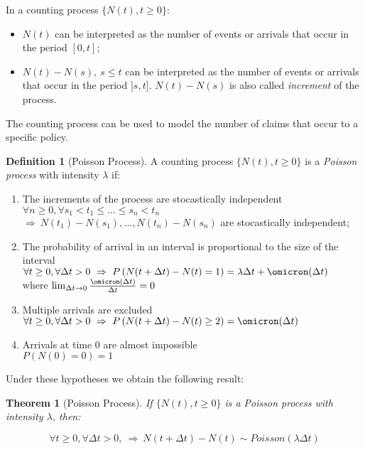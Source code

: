 \documentclass[a4paper, nobind]{templates/ociamthesis}
\providecommand{\tightlist}{%
  \setlength{\itemsep}{0pt}\setlength{\parskip}{0pt}}
\newtheorem{theorem}{Theorem}[chapter]
\theoremstyle{definition}
\newtheorem{definition}{Definition}[chapter]
\theoremstyle{definition}
\theoremstyle{definition}
\theoremstyle{remark}
\begin{document}
In a counting process \(\{N(t), t\ge0\}\):

\begin{itemize}
\tightlist
\item
  \(N(t)\) can be interpreted as the number of events or arrivals that occur in the period \([0, t]\);
\item
  \(N(t) - N(s), \ s\le t\) can be interpreted as the number of events or arrivals that occur in the period \(]s, t]\). \(N(t) - N(s)\) is also called \emph{increment} of the process.
\end{itemize}

The counting process can be used to model the number of claims that occur to a specific policy.

\begin{definition}[Poisson Process]
\label{def:def-process-poisson} \iffalse (Poisson Process) \fi{} A counting process \(\{N(t), t\ge0\}\) is a \textit{Poisson process} with intensity \(\lambda\) if:

\begin{enumerate}
\item The increments of the process are stocastically independent \\
      $\forall n\ge0, \forall s_1 < t_1 \le \dots \le s_n < t_n$ \\
      $\Rightarrow \ N(t_1)-N(s_1), \dots, N(t_n)-N(s_n)$ are stocastically independent;
\item The probability of arrival in an interval is proportional to the size of the interval \\
      $\forall t\ge 0, \forall \Delta t >0 \ \Rightarrow \ P\left( N(t + \Delta t) - N(t) = 1 \right) = \lambda \Delta t + \omicron (\Delta t)$ \\
      where $\lim_{\Delta t \to 0}{\frac{\omicron(\Delta t)}{\Delta t}} = 0$
\item Multiple arrivals are excluded \\
      $\forall t\ge 0, \forall \Delta t >0 \ \Rightarrow \ P\left( N(t + \Delta t) - N(t) \ge 2 \right) = \omicron (\Delta t)$
\item Arrivals at time $0$ are almost impossible \\
      $P\left( N(0) = 0 \right) = 1 $
\end{enumerate}
\end{definition}

Under these hypotheses we obtain the following result:

\begin{theorem}[Poisson Process]
\label{thm:th-process-poisson} \iffalse (Poisson Process) \fi{} If \(\{N(t), t\ge 0 \}\) is a Poisson process with intensity \(\lambda\), then:

\[\forall t\ge 0, \forall \Delta t >0, \ \Rightarrow \ N(t + \Delta t) - N(t) \sim Poisson(\lambda \Delta t)\]
\end{theorem}
\end{document}
